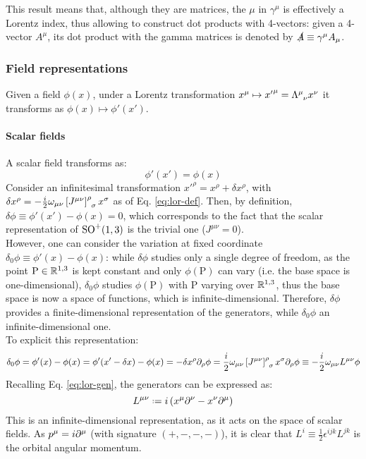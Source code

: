 This result means that, although they are matrices, the $ \mu $ in $ \gamma^\mu $ is effectively a Lorentz index, thus allowing to construct dot products with 4-vectors: given a 4-vector $ A^\mu $, its dot product with the gamma matrices is denoted by $ \slashed{A} \equiv \gamma^\mu A_\mu $.

\subsubsection{Field representations}

Given a field $ \phi(x) $, under a Lorentz transformation $ x^\mu \mapsto {x'}^\mu = \tensor{\Lambda}{^\mu_\nu} x^\nu $ it transforms as $ \phi(x) \mapsto \phi'(x') $.

\paragraph{Scalar fields}

A scalar field transforms as:
\begin{equation}
  \phi'(x') = \phi(x)
  \label{eq:lor-scal-field}
\end{equation}
Consider an infinitesimal transformation $ x'^\rho = x^\rho + \delta x^\rho $, with $ \delta x^\rho = - \frac{i}{2} \omega_{\mu \nu} \tensor{\left[ J^{\mu \nu} \right]}{^\rho_\sigma} x^\sigma $ as of Eq. \ref{eq:lor-def}. Then, by definition, $ \delta \phi \equiv \phi'(x') - \phi(x) = 0 $, which corresponds to the fact that the scalar representation of $ \mathrm{SO}^+(1,3) $ is the trivial one ($ J^{\mu \nu} = 0 $).\\
However, one can consider the variation at fixed coordinate $ \delta_0 \phi \equiv \phi'(x) - \phi(x) $: while $ \delta \phi $ studies only a single degree of freedom, as the point $ \text{P} \in \mathbb{R}^{1,3} $ is kept constant and only $ \phi(\text{P}) $ can vary (i.e. the base space is one-dimensional), $ \delta_0 \phi $ studies $ \phi(\text{P}) $ with $ \text{P} $ varying over $ \mathbb{R}^{1,3} $, thus the base space is now a space of functions, which is infinite-dimensional. Therefore, $ \delta \phi $ provides a finite-dimensional representation of the generators, while $ \delta_0 \phi $ an infinite-dimensional one.\\
To explicit this representation:
\begin{equation*}
  \delta_0 \phi = \phi'(x) - \phi(x) = \phi'(x' - \delta x) - \phi(x) = - \delta x^\rho \pa_\rho \phi = \frac{i}{2} \omega_{\mu \nu} \tensor{\left[ J^{\mu \nu} \right]}{^\rho_\sigma} x^\sigma \pa_\rho \phi \equiv - \frac{i}{2} \omega_{\mu \nu} L^{\mu \nu} \phi
\end{equation*}
Recalling Eq. \ref{eq:lor-gen}, the generators can be expressed as:
\begin{equation}
  L^{\mu \nu} \defeq i \left( x^\mu \pa^\nu - x^\nu \pa^\mu \right)
  \label{eq:ang-mom-oper}
\end{equation}
This is an infinite-dimensional representation, as it acts on the space of scalar fields. As $ p^\mu = i \partial^\mu $ (with signature $ (+,-,-,-) $), it is clear that $ L^i \equiv \frac{1}{2} \epsilon^{ijk} L^{jk} $ is the orbital angular momentum.

